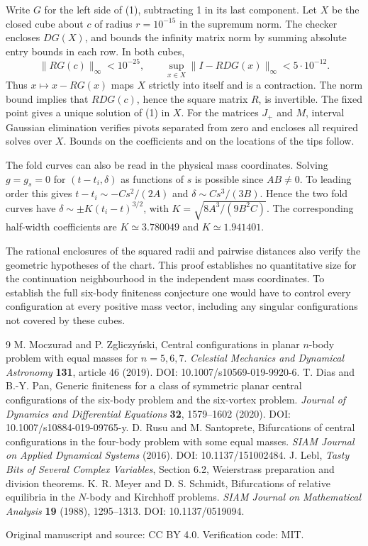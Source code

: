 \documentclass[11pt]{article}
\begin{document}
Write $G$ for the left side of (1), subtracting 1 in its last component.
Let $X$ be the closed cube about $c$ of radius $r=10^{-15}$ in the
supremum norm. The checker encloses $DG(X)$, and bounds the infinity
matrix norm by summing absolute entry bounds in each row. In both cubes,
\[
 \|R G(c)\|_\infty<10^{-25},\qquad
 \sup_{x\in X}\|I-RDG(x)\|_\infty<5\cdot10^{-12}.
\]
Thus $x\mapsto x-RG(x)$ maps $X$ strictly into itself and is a contraction.
The norm bound implies that $RDG(c)$, hence the square matrix $R$, is
invertible. The fixed point gives a unique solution of (1) in $X$. For
the matrices $J_+$ and $M$, interval Gaussian elimination verifies
pivots separated from zero and encloses all required solves over $X$.
Bounds on the coefficients and on the locations of the tips follow.

The fold curves can also be read in the physical mass coordinates.
Solving $g=g_s=0$ for $(t-t_i,\delta)$ as functions of $s$ is possible
since $AB\ne0$. To leading order this gives
$t-t_i\sim-C s^2/(2A)$ and $\delta\sim C s^3/(3B)$.
Hence the two fold curves have
$\delta\sim\pm K(t_i-t)^{3/2}$, with
$K=\sqrt{8A^3/(9B^2C)}$. The corresponding half-width coefficients are
$K\simeq3.780049$ and $K\simeq1.941401$.

The rational enclosures of the squared radii and pairwise distances also
verify the geometric hypotheses of the chart. This proof establishes no
quantitative size for the continuation neighbourhood in the independent
mass coordinates. To establish the full six-body finiteness conjecture
one would have to control every configuration at every positive mass
vector, including any singular configurations not covered by these cubes.

\begin{thebibliography}{9}
M. Moczurad and P. Zgliczy\'nski,
Central configurations in planar $n$-body problem with equal masses for
$n=5,6,7$. \emph{Celestial Mechanics and Dynamical Astronomy}
\textbf{131}, article 46 (2019). DOI: 10.1007/s10569-019-9920-6.
 T. Dias and B.-Y. Pan,
Generic finiteness for a class of symmetric planar central configurations
of the six-body problem and the six-vortex problem.
\emph{Journal of Dynamics and Differential Equations}
\textbf{32}, 1579--1602 (2020). DOI: 10.1007/s10884-019-09765-y.
 D. Rusu and M. Santoprete,
Bifurcations of central configurations in the four-body problem with some equal masses.
\emph{SIAM Journal on Applied Dynamical Systems} (2016).
DOI: 10.1137/151002484.
 J. Lebl, \emph{Tasty Bits of Several Complex Variables},
Section 6.2, Weierstrass preparation and division theorems.
 K. R. Meyer and D. S. Schmidt,
Bifurcations of relative equilibria in the $N$-body and Kirchhoff problems.
\emph{SIAM Journal on Mathematical Analysis} \textbf{19} (1988), 1295--1313.
DOI: 10.1137/0519094.
\end{thebibliography}
\medskip\noindent Original manuscript and source: CC BY 4.0. Verification code: MIT.
\end{document}
